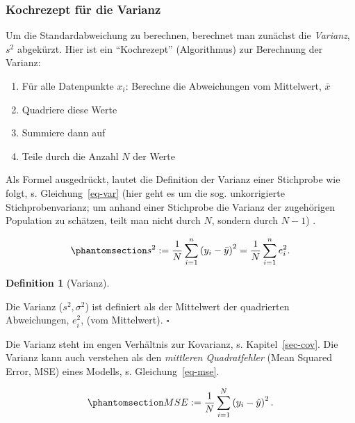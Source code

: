 \documentclass[
  letterpaper,
]{scrbook}
\providecommand{\tightlist}{%
  \setlength{\itemsep}{0pt}\setlength{\parskip}{0pt}}\usepackage{longtable,booktabs,array}
\theoremstyle{definition}
\theoremstyle{definition}
\theoremstyle{definition}
\newtheorem{definition}{Definition}[chapter]
\theoremstyle{remark}
\begin{document}
\subsubsection{Kochrezept für die
Varianz}\label{kochrezept-fuxfcr-die-varianz}

Um die Standardabweichung zu berechnen, berechnet man zunächst die
\emph{Varianz}, \(s^2\) abgekürzt. Hier ist ein \enquote{Kochrezept}
(Algorithmus) zur Berechnung der Varianz:

\begin{enumerate}
\def\labelenumi{\arabic{enumi}.}
\tightlist
\item
  Für alle Datenpunkte \(x_i\): Berechne die Abweichungen vom
  Mittelwert, \(\bar{x}\)
\item
  Quadriere diese Werte
\item
  Summiere dann auf
\item
  Teile durch die Anzahl \(N\) der Werte
\end{enumerate}

Als Formel ausgedrückt, lautet die Definition der Varianz einer
Stichprobe wie folgt, s. Gleichung~\ref{eq-var} (hier geht es um die
sog. unkorrigierte Stichprobenvarianz; um anhand einer Stichprobe die
Varianz der zugehörigen Population zu schätzen, teilt man nicht durch
\(N\), sondern durch \(N-1\)) .

\begin{equation}\phantomsection\label{eq-var}{{\displaystyle s^{2}:={\frac {1}{N}}\sum _{i=1}^{n}\left(y_{i}-{\bar {y}}\right)^{2}={\frac {1}{N}}\sum _{i=1}^{n}e_i^{2}.}}\end{equation}

\begin{definition}[Varianz]\protect\hypertarget{def-var}{}\label{def-var}

Die Varianz (\(s^2, \sigma^2\)) ist definiert als der Mittelwert der
quadrierten Abweichungen, \(e_i^2\), (vom Mittelwert). \(\square\)

\end{definition}

Die Varianz steht im engen Verhältnis zur Kovarianz, s.
Kapitel~\ref{sec-cov}. Die Varianz kann auch verstehen als den
\emph{mittleren Quadratfehler} (Mean Squared Error, MSE) eines Modells,
s. Gleichung~\ref{eq-mse}.

\begin{equation}\phantomsection\label{eq-mse}{{\displaystyle MSE:={\frac {1}{N}}\sum _{i=1}^{N}\left(y_{i}-{\hat {y}}\right)^{2}.}}\end{equation}
\end{document}

